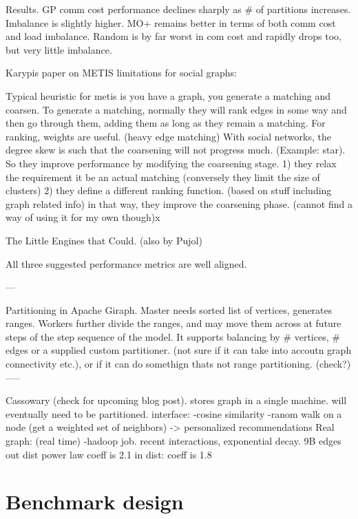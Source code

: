 \documentclass{article}
\begin{document}
Results.  GP comm cost performance declines sharply as # of partitions increases. Imbalance is slightly higher.
MO+ remains better in terms of both comm cost and load imbalance.
Random is by far worst in com cost and rapidly drops too, but very little imbalance.

Karypis paper on METIS limitations for social graphs:

Typical heuristic for metis is you have a graph, you generate a matching and coarsen. 
To generate a matching, normally they will rank edges in some way and then go through them, adding them 
as long as they remain a matching. For ranking, weights are useful. (heavy edge matching)
With social networks, the degree skew is such that the coarsening will not progress much. 
(Example: star). So they improve performance by modifying the coarsening stage. 1) they relax the requirement it be an actual
matching (conversely they limit the size of clusters) 2) they define a different ranking function. (based on stuff including graph related info)
in that way, they improve the coarsening phase. (cannot find a way of using it for my own though)x


The Little Engines that Could. (also by Pujol)


All three suggested performance metrics are well aligned.


---

Partitioning in Apache Giraph. Master needs sorted list of vertices, generates ranges. Workers further divide the ranges, and may move them 
across at future steps of the step sequence of the model. 
It supports balancing by # vertices, # edges or a supplied custom partitioner. (not sure if it can take into accoutn graph connectivity etc.), or if it can 
do somethign thats not range partitioning.  (check?)
-----

Cassowary (check for upcoming blog post). stores graph in a single machine. will eventually need to be partitioned.
interface:
-cosine similarity
-ranom walk on a node (get a weighted set of neighbors) -> personalized recommendations
Real graph: (real time)
-hadoop job. recent interactions, exponential decay. 9B edges
out dist power law coeff is 2.1 
in dist: coeff is 1.8




\section{Benchmark design}
\end{document}
